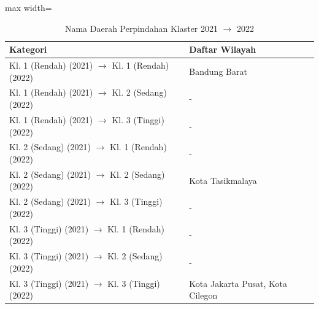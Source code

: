 \begin{table}[H]
\centering
\caption{Nama Daerah Perpindahan Klaster 2021 \(\rightarrow\) 2022} \label{tab:sampletransname2021x2022}
\begin{adjustbox}{max width=\textwidth}
\begin{tabular}{|p{4cm}|p{10cm}|}
\hline
\textbf{Kategori} & \textbf{Daftar Wilayah} \\
\hline
Kl. 1 (Rendah) (2021) \(\rightarrow\) Kl. 1 (Rendah) (2022) & Bandung Barat \\
\hline
Kl. 1 (Rendah) (2021) \(\rightarrow\) Kl. 2 (Sedang) (2022) & - \\
\hline
Kl. 1 (Rendah) (2021) \(\rightarrow\) Kl. 3 (Tinggi) (2022) & - \\
\hline
Kl. 2 (Sedang) (2021) \(\rightarrow\) Kl. 1 (Rendah) (2022) & - \\
\hline
Kl. 2 (Sedang) (2021) \(\rightarrow\) Kl. 2 (Sedang) (2022) & Kota Tasikmalaya \\
\hline
Kl. 2 (Sedang) (2021) \(\rightarrow\) Kl. 3 (Tinggi) (2022) & - \\
\hline
Kl. 3 (Tinggi) (2021) \(\rightarrow\) Kl. 1 (Rendah) (2022) & - \\
\hline
Kl. 3 (Tinggi) (2021) \(\rightarrow\) Kl. 2 (Sedang) (2022) & - \\
\hline
Kl. 3 (Tinggi) (2021) \(\rightarrow\) Kl. 3 (Tinggi) (2022) & Kota Jakarta Pusat, Kota Cilegon \\
\hline
\end{tabular}
\end{adjustbox}
\end{table}